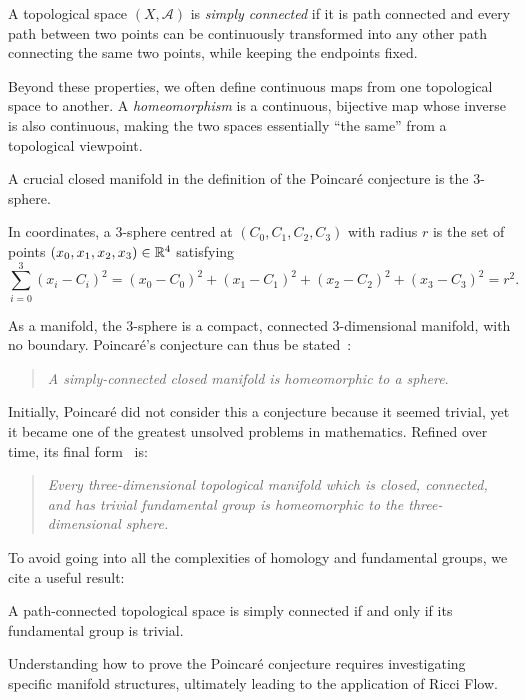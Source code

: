 \begin{definition}
    A topological space $(X,\mathcal{A})$ is \emph{simply connected} if it is path connected and every path between two points can be continuously transformed into any other path connecting the same two points, while keeping the endpoints fixed.
\end{definition}

Beyond these properties, we often define continuous maps from one topological space to another. A \emph{homeomorphism} is a continuous, bijective map whose inverse is also continuous, making the two spaces essentially “the same” from a topological viewpoint.

A crucial closed manifold in the definition of the Poincaré conjecture is the $3$-sphere.

\begin{definition}[$3$-sphere]
    In coordinates, a $3$-sphere centred at $(C_0,C_1,C_2,C_3)$ with radius $r$ is the set of points $(x_0,x_1,x_2,x_3) \in \mathbb{R}^4$ satisfying
    \begin{equation}
        \sum_{i=0}^3 (x_i - C_i)^2 = (x_0 - C_0)^2 + (x_1 - C_1)^2 + (x_2 - C_2)^2 + (x_3 - C_3)^2 = r^2.
    \end{equation}
\end{definition}

As a manifold, the $3$-sphere  is a compact, connected $3$-dimensional manifold, with no boundary. Poincaré's conjecture can thus be stated~\cite{poincare:analysis-situs}:

\begin{quotation}
    \noindent \emph{A simply-connected closed manifold is homeomorphic to a sphere}.
\end{quotation}

Initially, Poincaré did not consider this a conjecture because it seemed trivial, yet it became one of the greatest unsolved problems in mathematics. Refined over time, its final form~\cite{poincare:complement} is:

\begin{quotation}
    \noindent \emph{Every three-dimensional topological manifold which is closed, connected, and has trivial fundamental group is homeomorphic to the three-dimensional sphere.}
\end{quotation}

To avoid going into all the complexities of homology and fundamental groups, we cite a useful result:

\begin{theorem}
    A path-connected topological space is simply connected if and only if its fundamental group is trivial.
\end{theorem}

Understanding how to prove the Poincaré conjecture requires investigating specific manifold structures, ultimately leading to the application of Ricci Flow.